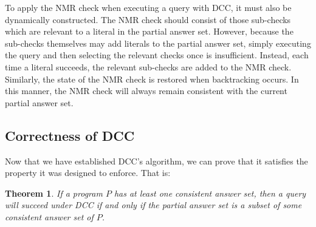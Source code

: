 \documentclass{new_tlp}
\newtheorem{theorem}{Theorem}
\begin{document}
To apply the NMR check when executing a query with DCC, it must also be 
dynamically constructed. The NMR check should consist of those sub-checks which 
are relevant to a literal in the partial answer set. However, because the 
sub-checks themselves may add literals to the partial answer set, simply 
executing the query and then selecting the relevant checks once is 
insufficient. Instead, each time a literal succeeds, the relevant sub-checks 
are added to the NMR check. Similarly, the state of the NMR check is restored 
when backtracking occurs. In this manner, the NMR check will always remain 
consistent with the current partial answer set.


\subsection{Correctness of DCC} \label{sec:proof}

Now that we have established DCC's algorithm, we can prove that it satisfies 
the property it was designed to enforce. That is:

\begin{theorem}
If a program $P$ has at least one consistent answer set, then a query will
succeed under DCC if and only if the partial answer set is a subset of some
consistent answer set of $P$.
\end{theorem}
\end{document}
